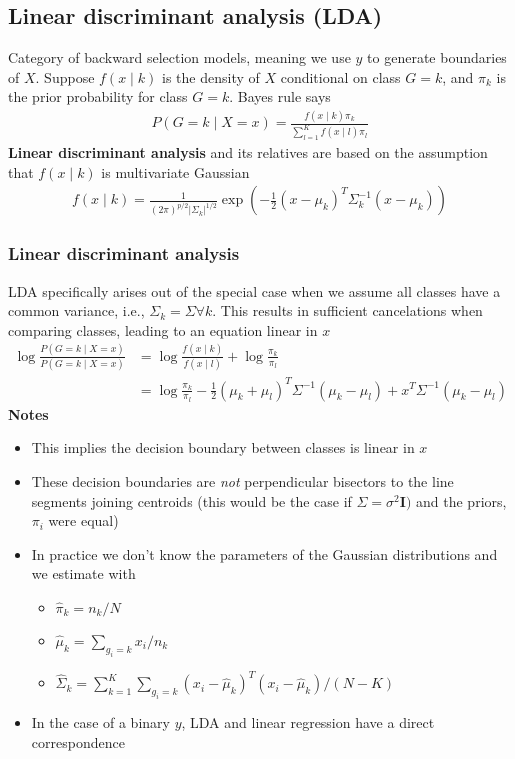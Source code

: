 \documentclass{article}
\newcommand{\abs}[1]{\lvert#1\rvert}
\begin{document}
\subsection{Linear discriminant analysis (LDA)}
Category of backward selection models, meaning we use $y$ to generate boundaries of $X$. Suppose $f(x \mid k)$ is the density of $X$ conditional on class $G=k$, and $\pi_k$ is the prior probability for class $G=k$. Bayes rule says
\begin{align*}
  P(G=k \mid X=x) = \frac{f(x\mid k) \pi_k}{\sum_{l=1}^Kf(x \mid l)\pi_l}
\end{align*}
\textbf{Linear discriminant analysis} and its relatives are based on the assumption that $f(x \mid k)$ is multivariate Gaussian
\begin{align*}
  f(x \mid k) = \frac{1}{(2\pi)^{p/2}\abs{\Sigma_k}^{1/2}}\exp(-\frac{1}{2}(x - \mu_k)^T \Sigma_k^{-1}(x - \mu_k))
\end{align*}
\subsubsection{Linear discriminant analysis}
LDA specifically arises out of the special case when we assume all classes have a common variance, i.e., $\Sigma_k = \Sigma \forall k$. This results in sufficient cancelations when comparing classes, leading to an equation linear in $x$
\begin{align*}
  \log\frac{P(G=k \mid X=x)}{P(G=k \mid X=x)} &= \log\frac{f(x \mid k)}{f(x \mid l)} + \log\frac{\pi_k}{\pi_l}\\
  &= \log\frac{\pi_k}{\pi_l} - \frac{1}{2}(\mu_k + \mu_l)^T\Sigma^{-1}(\mu_k - \mu_l) + x^T\Sigma^{-1}(\mu_k - \mu_l)
\end{align*}
\textbf{Notes}
\begin{itemize}
  \item This implies the decision boundary between classes is linear in $x$
  \item These decision boundaries are \textit{not} perpendicular bisectors to the line segments joining centroids (this would be the case if $\Sigma = \sigma^2\mathbf{I})$ and the priors, $\pi_i$ were equal)
  \item In practice we don't know the parameters of the Gaussian distributions and we estimate with
  \begin{itemize}
    \item $\hat{\pi}_k = n_k / N$
    \item $\hat{\mu}_k = \sum_{g_i = k}x_i/n_k$
    \item $\hat{\Sigma}_k = \sum_{k=1}^K\sum_{g_i=k}(x_i - \hat{\mu}_k)^T(x_i - \hat{\mu}_k)/(N - K)$
  \end{itemize}
  \item In the case of a binary $y$, LDA and linear regression have a direct correspondence
\end{itemize}
\end{document}
